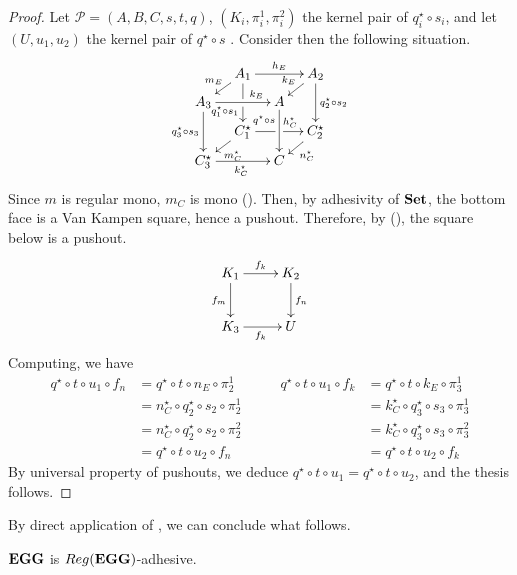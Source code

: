 \begin{proof}
	Let $\mathcal{P} = (A, B, C, s, t, q)$, $(K_i, \pi_i^1, \pi_i^2)$ the kernel pair of $q_i^\star \circ s_i$, and let $(U, u_1, u_2)$ the kernel pair of $q^\star \circ s$ .
	Consider then the following situation.
	\[\xymatrix@C=10pt@R=6pt{&A_1\ar[dd]|\hole_(.65){q_1^\star \circ s_1}\ar[rr]^{h_E} \ar[dl]_{m_E} && A_2 \ar[dd]^{q_2^\star \circ s_2} \ar[dl]_{k_E} \\ A_3 \ar[dd]_{q_3^\star \circ s_3}\ar[rr]^(.7){k_E} & & A \ar[dd]_(.3){q^\star \circ s}\\&{C_1^\star}\ar[rr]|\hole^(.65){h_C^\star}\ar[dl]^{m_C^\star} && {C_2^\star} \ar[dl]^{n_C^\star} \\{C_3^\star} \ar[rr]_{k_C^\star} & & C}\]
	Since $m$ is regular mono, $m_C$ is mono ({\color{red}{inserire citazione}}). Then, by adhesivity of $\mathbf{Set}$, the bottom face is a Van Kampen square, hence a pushout. Therefore, by ({\color{red}{citazione}}), the square below is a pushout.
	\[\xymatrix{K_1\ar[r]^{f_k}\ar[d]_{f_m}&K_2\ar[d]^{f_n}\\K_3\ar[r]_{f_k}&U}\]
       Computing, we have
        \[
                \begin{split}
                        q^\star \circ t \circ u_1 \circ f_n &= q^\star \circ t \circ n_E \circ \pi_2^1 \\ &= n_C^\star \circ q_2^\star \circ s_2 \circ \pi_2^1 \\&= n_C^\star \circ q_2^\star \circ s_2 \circ \pi_2^2 \\&=q^\star \circ t \circ u_2 \circ f_n 
                        \end{split}
                        \qquad
                        \begin{split} q^\star \circ t \circ u_1 \circ f_k &= q^\star \circ t \circ k_E \circ \pi_3^1 \\ &= k_C^\star \circ q_3^\star \circ s_3 \circ \pi_3^1 \\&= k_C^\star \circ q_3^\star \circ s_3 \circ \pi_3^2 \\&=q^\star \circ t \circ u_2 \circ f_k
                        \end{split}
        \]
        By universal property of pushouts, we deduce $q^\star \circ t \circ u_1 = q^\star \circ t \circ u_2$, and the thesis follows.
\end{proof}

By direct application of , we can conclude what follows.

\begin{corollary}
	$\textbf{\textup{EGG}}$ is $\reg(\egg)$-adhesive.
\end{corollary}
